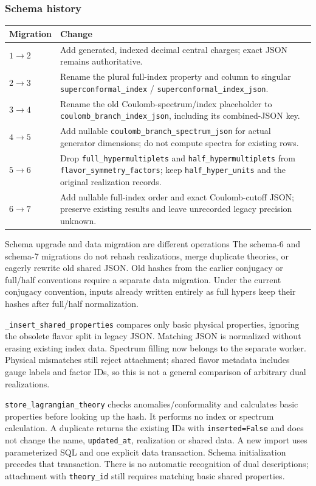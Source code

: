 \documentclass[11pt,a4paper]{article}
\numberwithin{equation}{section}
\newcommand{\code}[1]{{\small\nolinkurl{#1}}}
\begin{document}
\subsubsection{Schema history}
\begin{tabularx}{\textwidth}{@{}p{17mm}Y@{}}
\toprule Migration & Change\\\midrule
$1\to2$ & Add generated, indexed decimal central charges; exact JSON remains
 authoritative.\\
$2\to3$ & Rename the plural full-index property and column to singular
\code{superconformal_index} / \code{superconformal_index_json}.\\
$3\to4$ & Rename the old Coulomb-spectrum/index placeholder to
\code{coulomb_branch_index_json}, including its combined-JSON key.\\
$4\to5$ & Add nullable \code{coulomb_branch_spectrum_json} for actual generator
dimensions; do not compute spectra for existing rows.\\
$5\to6$ & Drop \code{full_hypermultiplets} and \code{half_hypermultiplets}
from \code{flavor_symmetry_factors}; keep \code{half_hyper_units} and the
original realization records.\\
$6\to7$ & Add nullable full-index order and exact Coulomb-cutoff JSON;
preserve existing results and leave unrecorded legacy precision unknown.\\\bottomrule
\end{tabularx}

\begin{note}{Schema upgrade and data migration are different operations}
The schema-6 and schema-7 migrations do not rehash realizations, merge duplicate theories, or
eagerly rewrite old shared JSON. Old hashes from the earlier conjugacy or
full/half conventions require a separate data migration. Under the current
conjugacy convention, inputs already written entirely as full hypers keep their
hashes after full/half normalization.
\end{note}

\code{_insert_shared_properties} compares only basic physical properties,
ignoring the obsolete flavor split in legacy JSON. Matching JSON is normalized
without erasing existing index data. Spectrum filling now belongs to the
separate worker. Physical mismatches still reject attachment; shared flavor
metadata includes gauge labels and factor IDs, so this is not a general
comparison of arbitrary dual realizations.

\code{store_lagrangian_theory} checks anomalies/conformality and calculates
basic properties before looking up the hash. It performs no index or spectrum
calculation. A duplicate returns the existing IDs with \code{inserted=False}
and does not change the name, \code{updated_at}, realization or shared data.
A new import uses parameterized SQL and one explicit data transaction.
Schema initialization precedes that transaction. There is no automatic
recognition of dual descriptions; attachment with \code{theory_id} still
requires matching basic shared properties.
\end{document}
